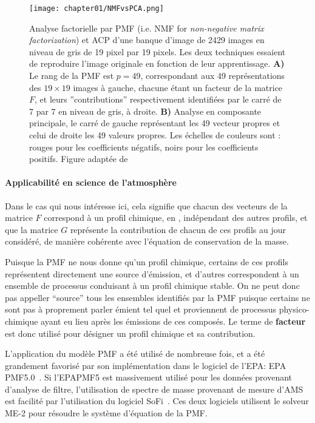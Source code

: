 \begin{figure}[ht]
    \centering
    \texttt{[image: chapter01/NMFvsPCA.png]}
    \caption{Analyse factorielle par PMF (i.e. NMF for \textit{non-negative matrix
    factorization}) et ACP d'une banque d'image de 2429 images en niveau de gris de 19
    pixel par 19 pixels. Les deux techniques essaient de reproduire l'image originale en
    fonction de leur apprentissage.
    \textbf{A)} Le rang de la PMF est $p=49$, correspondant aux 49
    représentations des $19\times19$ images à gauche, chacune étant un facteur de la
    matrice $F$, et leurs ''contributions'' respectivement identifiées par le carré de 7 par
    7 en niveau de gris, à droite.
    \textbf{B)} Analyse en composante principale, le carré de gauche représentant les 49
    vecteur propres et celui de droite les 49 valeurs propres.
    Les échelles de couleurs sont : rouges pour les coefficients négatifs, noirs pour les
    coefficients positifs.
    Figure adaptée de \textcite{leeLearning1999}}%
    \label{fig:chapter01/NMFvsPCA}
\end{figure}

\paragraph{Applicabilité en science de l'atmosphère}%
\label{par:applicabilité_en_science_de_l_atmosphère}

Dans le cas qui nous intéresse ici, cela signifie que chacun des vecteurs de la matrice
$F$ correspond à un profil chimique, en \si{\ugm}, indépendant des autres profils, et
que la matrice $G$ représente la contribution de chacun de ces profils au jour
considéré, de manière cohérente avec l'équation de conservation de la masse.

Puisque la PMF ne nous donne qu'un profil chimique, certains de ces profils représentent
directement une source d'émission, et d'autres correspondent à un ensemble de processus
conduisant à un profil chimique stable. On ne peut donc pas appeller ``source'' tous les ensembles
identifiés par la PMF puisque certains ne sont pas à proprement parler émient tel quel et
proviennent de processus physico-chimique ayant eu lieu après les émissions de ces
composés.
Le terme de \textbf{facteur} est donc utilisé pour désigner un profil chimique et sa
contribution.

L'application du modèle PMF a été utilisé de nombreuse fois, et a été grandement favorisé
par son implémentation dans le logiciel de l'EPA: EPA PMF5.0~\autocite{norrisEPA2014}.
Si l'EPAPMF5 est massivement utilisé pour les données provenant d'analyse de
filtre, l'utilisation de spectre de masse provenant de mesure d'AMS est facilité par
l'utilisation du logiciel SoFi~\autocite{canonacoSoFi2013}. Ces deux logiciels utilisent
le solveur ME-2 pour résoudre le système d'équation de la PMF.

